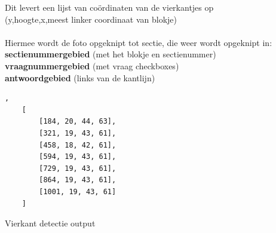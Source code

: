 \documentclass[12pt]{article}
\begin{document}
\begin{multicols}{2}
   Dit levert een lijst van coördinaten van de vierkantjes op\\(y,hoogte,x,meest linker coordinaat van blokje)\\
   \\
   Hiermee wordt de foto opgeknipt tot sectie, die weer wordt opgeknipt in:\\
   \textbf{sectienummergebied} (met het blokje en sectienummer) \\
   \textbf{vraagnummergebied} (met vraag checkboxes) \\
   \textbf{antwoordgebied} (links van de kantlijn)
   
    \begin{listing}[H]
    \begin{verbatim},
    [
        [184, 20, 44, 63], 
        [321, 19, 43, 61], 
        [458, 18, 42, 61], 
        [594, 19, 43, 61], 
        [729, 19, 43, 61], 
        [864, 19, 43, 61], 
        [1001, 19, 43, 61]
    ]
    \end{verbatim}
    \caption{Vierkant detectie output} 
    \label{json-example}
    \end{listing}\\ 
\end{multicols}
\end{document}
